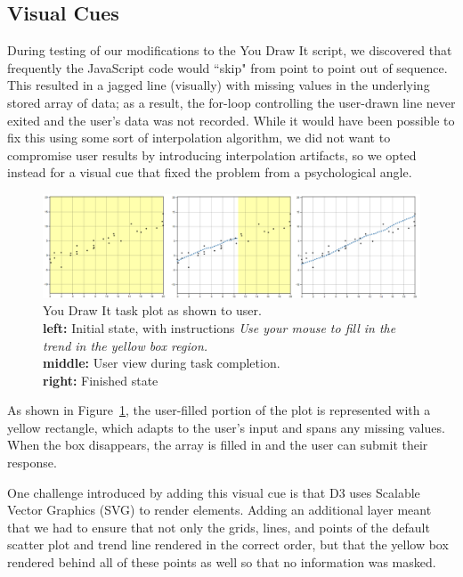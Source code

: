 \documentclass[
  letterpaper,
  DIV=11,
  numbers=noendperiod]{scrartcl}
\newcommand{\svp}[1]{{\textcolor{RedOrange}{#1}}}
\begin{document}
\hypertarget{visual-cues}{%
\subsection{Visual Cues}\label{visual-cues}}

\svp{During testing of our modifications to the You Draw It script, we discovered that frequently the JavaScript code would ``skip" from point to point out of sequence. This resulted in a jagged line (visually) with missing values in the underlying stored array of data; as a result, the for-loop controlling the user-drawn line never exited and the user's data was not recorded. While it would have been possible to fix this using some sort of interpolation algorithm, we did not want to compromise user results by introducing interpolation artifacts, so we opted instead for a visual cue that fixed the problem from a psychological angle.}

\begin{figure}

{\centering \includegraphics{images/ydi-stimuli.png}

}

\caption{\label{fig-you-draw-it-task-plot}You Draw It task plot as shown
to user.\\
\textbf{left:} Initial state, with instructions \emph{Use your mouse to
fill in the trend in the yellow box region.}\\
\textbf{middle:} User view during task completion.\\
\textbf{right:} Finished state}

\end{figure}

As shown in Figure~\ref{fig-you-draw-it-task-plot}, the user-filled
portion of the plot is represented with a yellow rectangle, which adapts
to the user's input and spans any missing values. When the box
disappears, the array is filled in and the user can submit their
response.

\svp{One challenge introduced by adding this visual cue is that D3 uses Scalable Vector Graphics (SVG) to render elements. Adding an additional layer meant that we had to ensure that not only the grids, lines, and points of the default scatter plot and trend line rendered in the correct order, but that the yellow box rendered behind all of these points as well so that no information was masked.}
\end{document}
